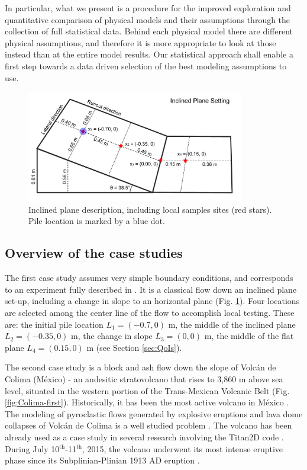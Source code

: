 \documentclass{article}
\begin{document}
In particular, what we present is a procedure for the improved exploration and quantitative comparison of physical models and their assumptions through the collection of full statistical data. Behind each physical model there are different physical assumptions, and therefore it is more appropriate to look at those instead than at the entire model results. Our statistical approach shall enable a first step towards a data driven selection of the best modeling assumptions to use.

\begin{figure}[H]
    \includegraphics[width=0.85\textwidth]{InclinedPlane/inclPlaneFig.jpg}
    \centering
    \caption{Inclined plane description, including local samples sites (red stars). Pile location is marked by a blue dot.}
    \label{fig:Ramp-first}
\end{figure}

\subsection{Overview of the case studies}
The first case study assumes very simple boundary conditions, and corresponds to an experiment fully described in \cite{Webb2004, Bursik2005, WebbBursik2016}. It is a classical flow down an inclined plane set-up, including a change in slope to an horizontal plane (Fig. \ref{fig:Ramp-first}). Four locations are selected among the center line of the flow to accomplish local testing. These are: the initial pile location $L_1=(-0.7,0)$ m, the middle of the inclined plane $L_2=(-0.35,0)$ m, the change in slope $L_3=(0,0)$ m, the middle of the flat plane $L_4=(0.15,0)$ m (see Section \ref{sec:QoIs}).

The second case study is a block and ash flow down the slope of Volc{\'a}n de Colima (M{\'e}xico) - an andesitic stratovolcano that rises to 3,860 m above sea level, situated in the western portion of the Trans-Mexican Volcanic Belt (Fig. \ref{fig:Colima-first}). Historically, it has been the most active volcano in M{\'e}xico \citep{DeLaCruzReina1993, Zobin2002, Gonzalez2002}. The modeling of pyroclastic flows generated by explosive eruptions and lava dome collapses of Volc{\'a}n de Colima is a well studied problem \citep{DelPozzo1995,Sheridan1995,Saucedo2002,Saucedo2004,Saucedo2005, Sarocchi2011, Capra2015}. The volcano has been already used as a case study in several research involving the Titan2D code \citep{Rupp2004, Rupp2006, Dalbey2008, Yu2009, Sulpizio2010, Capra2011, Aghakhani2016}. During July 10$^{\mathrm{th}}$-11$^{\mathrm{th}}$, 2015, the volcano underwent its most intense eruptive phase since its Subplinian-Plinian 1913 AD eruption \citep{Saucedo2010, Zobin2015, ReyesDaVilla2016, Capra2016}.
\end{document}
